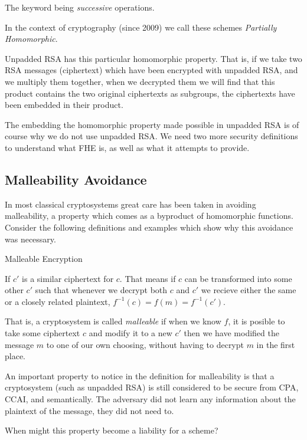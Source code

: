 The keyword being \emph{successive} operations.

In the context of cryptography (since 2009) we call these schemes \emph{Partially Homomorphic}. 

Unpadded RSA has this particular homomorphic property. That is, if we take two RSA messages (ciphertext) which have been encrypted with unpadded RSA, and we multiply them together, when we decrypted them we will find that this product contains the two original ciphertexts as subgroups, the ciphertexts have been embedded in their product. 

The embedding the homomorphic property made possible in unpadded RSA is of course why we do not use unpadded RSA. We need two more security definitions to understand what FHE is, as well as what it attempts to provide.


\subsection{Malleability Avoidance}

In most classical cryptosystems great care has been taken in avoiding malleability, a property which comes as a byproduct of homomorphic functions. 
Consider the following definitions and examples which show why this avoidance was necessary.


\begin{defn}{Malleable Encryption}
    
    If $c'$ is a similar ciphertext for $c$. That means if $c$ can be transformed into some other $c'$ such that whenever we decrypt both $c$ and $c'$ we recieve either the same or a closely related plaintext, $f^{-1}(c)= f(m) = f^{-1}(c')$. 
    
    That is, a cryptosystem is called \emph{malleable} if when we know $f$, it is posible to take some ciphertext $c$ and modify it to a new $c'$ then we have modified the message $m$ to one of our own choosing, without having to decrypt $m$ in the first place.
\end{defn}

\begin{nt}
    An important property to notice in the definition for malleability is that a cryptosystem (such as unpadded RSA) is still considered to be secure from CPA, CCAI, and semantically.
    The adversary did not learn any information about the plaintext of the message, they did not need to.
\end{nt}

When might this property become a liability for a scheme?

